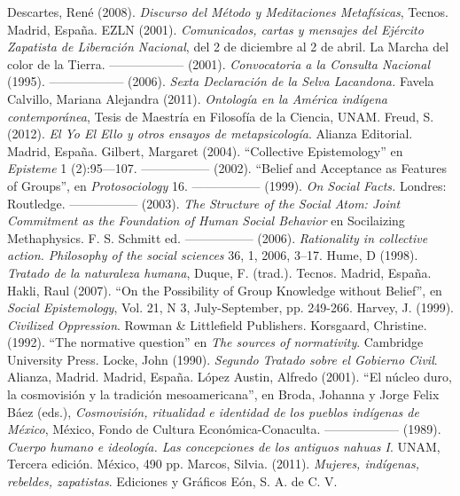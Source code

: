 \documentclass[oneside]{book}
\begin{document}
\begin{thebibliography}{99}
     Descartes, René (2008). \textit{Discurso del Método y Meditaciones Metafísicas}, Tecnos. Madrid, España.
     EZLN (2001). \textit{Comunicados, cartas y mensajes del Ejército Zapatista de Liberación Nacional}, del 2 de diciembre al 2 de abril. La Marcha del color de la Tierra.
     ------------------  (2001). \textit{Convocatoria a la Consulta Nacional} (1995).
     ------------------  (2006). \textit{Sexta Declaración de la Selva Lacandona.}
 Favela Calvillo, Mariana Alejandra (2011). \textit{Ontología en la América indígena contemporánea}, Tesis de Maestría en Filosofía de la Ciencia,  UNAM.
 Freud, S. (2012). \textit{El Yo El Ello y otros ensayos de metapsicología}. Alianza Editorial. Madrid, España.
 Gilbert, Margaret (2004). “Collective Epistemology” en \textit{Episteme} 1 (2):95—107.
 ----------------- (2002). “Belief and Acceptance as Features of Groups”, en \textit{Protosociology} 16.   
 ----------------- (1999). \textit{On Social Facts.} Londres: Routledge.
 ----------------- (2003). \textit{The Structure of the Social Atom: Joint Commitment as the Foundation of Human Social Behavior} en Socilaizing Methaphysics. F. S. Schmitt ed.
 ----------------- (2006). \textit{Rationality in collective action. Philosophy of the social sciences} 36, 1, 2006, 3–17.
 Hume, D (1998). \textit{Tratado de la naturaleza humana}, Duque, F. (trad.). Tecnos. Madrid, España.
 Hakli, Raul (2007). “On the Possibility of Group Knowledge without Belief”, en \textit{Social Epistemology}, Vol. 21, N 3, July-September, pp. 249-266.  
 Harvey, J. (1999). \textit{Civilized Oppression}. Rowman \& Littlefield Publishers.
 Korsgaard, Christine. (1992). “The normative question” en \textit{The sources of normativity}. Cambridge University Press.
 Locke, John (1990). \textit{Segundo Tratado sobre el Gobierno Civil}. Alianza, Madrid. Madrid, España.
 López Austin, Alfredo (2001). “El núcleo duro, la cosmovisión y la tradición mesoamericana”, en Broda, Johanna y Jorge Felix Báez (eds.), \textit{Cosmovisión, ritualidad e identidad de los pueblos indígenas de México}, México, Fondo de Cultura Económica-Conaculta.
------------------ (1989). \textit{Cuerpo humano e ideología. Las concepciones de los antiguos nahuas I}. UNAM, Tercera edición. México, 490 pp.
 Marcos, Silvia. (2011). \textit{Mujeres, indígenas, rebeldes, zapatistas}. Ediciones y Gráficos Eón, S. A. de C. V.

\end{thebibliography}
\end{document}
